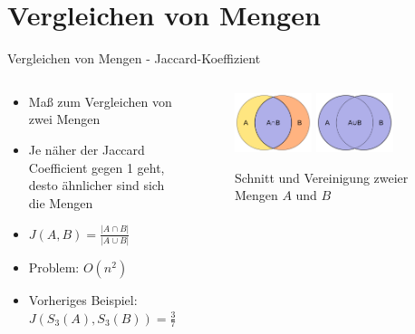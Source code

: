 \section{Vergleichen von Mengen}

\begin{frame}{Vergleichen von Mengen - Jaccard-Koeffizient}
    \begin{columns} %
        \begin{column}{.50\textwidth}
            \begin{itemize}
                \item Maß zum Vergleichen von zwei Mengen
                \item Je näher der Jaccard Coefficient gegen 1 geht, desto ähnlicher sind sich die Mengen
                \item $ J(A,B) = \frac{ | A \cap B | }{ | A \cup B | } $
                \item Problem: $ O(n^2) $
                \item Vorheriges Beispiel: $ J(S_3(A),S_3(B)) = \frac{3}{7} \approx 0.43 $
            \end{itemize}
        \end{column}
        \hfill
        \begin{column}{.50\textwidth}
            \begin{figure}[H]
                \centering
                \includegraphics[width=0.40\textwidth]{images/Intersection_of_sets_A_and_B.png} 
                \includegraphics[width=0.40\textwidth]{images/Union_of_sets_A_and_B.png}
                \caption{Schnitt und Vereinigung zweier Mengen $ A $ und $ B $ \cite{intersectionImage,unionImage}}
            \end{figure}        
        \end{column}
    \end{columns}
\end{frame}



